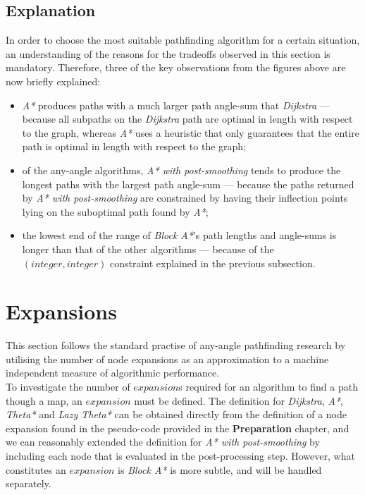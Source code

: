 \documentclass[12pt,notitlepage]{report}
\begin{document}
\subsection{Explanation}
In order to choose the most suitable pathfinding algorithm for a certain situation, an understanding of the reasons for the tradeoffs observed in this section is mandatory. Therefore, three of the key observations from the figures above are now briefly explained: 
\begin{itemize}
\item {\em A*} produces paths with a much larger path angle-sum that {\em Dijkstra} --- because all subpaths on the {\em Dijkstra} path are optimal in length with respect to the graph, whereas {\em A*} uses a heuristic that only guarantees that the entire path is optimal in length with respect to the graph;
\item of the any-angle algorithms, {\em A* with post-smoothing} tends to produce the longest paths with the largest path angle-sum --- because the paths returned by {\em A* with post-smoothing} are constrained by having their inflection points lying on the suboptimal path found by {\em A*};
\item the lowest end of the range of {\em Block A*}'s path lengths and angle-sums is longer than that of the other algorithms --- because of the $(integer,integer)$ constraint explained in the previous subsection. 
\end{itemize}

\section{Expansions}
This section follows the standard\cite{Nash12} practise of any-angle pathfinding research by utilising the number of node expansions as an approximation to a machine independent measure of algorithmic performance.\\

\noindent
To investigate the number of $expansion$s required for an algorithm  to find a path though a map, an $expansion$ must be defined. The definition for {\em Dijkstra}, {\em A*}, {\em Theta*} and {\em Lazy Theta*} can be obtained directly from the definition of a node expansion found in the pseudo-code provided in the {\bfseries Preparation} chapter, and we can reasonably extended the definition for {\em A* with post-smoothing} by including each node that is evaluated in the post-processing step. However, what constitutes an $expansion$ is {\em Block A*} is more subtle, and will be handled separately.\\
\end{document}
